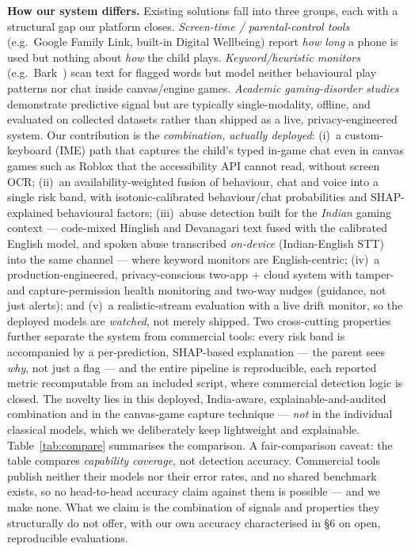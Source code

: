\documentclass[11pt,a4paper]{article}
\begin{document}
\textbf{How our system differs.} Existing solutions fall into three groups, each with a
structural gap our platform closes. \emph{Screen-time / parental-control tools} (e.g.\
Google Family Link, built-in Digital Wellbeing) report \emph{how long} a phone is used
but nothing about \emph{how} the child plays. \emph{Keyword/heuristic monitors} (e.g.\
Bark~\cite{bark2025}) scan text for flagged words but model neither behavioural play
patterns nor chat inside canvas/engine games. \emph{Academic gaming-disorder
studies}~\cite{huang2024,jiang2024,strojny2024} demonstrate predictive signal but are
typically single-modality, offline, and evaluated on collected datasets rather than
shipped as a live, privacy-engineered system. Our contribution is the \emph{combination,
actually deployed}: (i)~a custom-keyboard (IME) path that captures the child's typed
in-game chat even in canvas games such as Roblox that the accessibility API cannot read,
without screen OCR; (ii)~an availability-weighted fusion of behaviour, chat and voice
into a single risk band, with isotonic-calibrated behaviour/chat probabilities and
SHAP-explained behavioural factors; (iii)~abuse detection built
for the \emph{Indian} gaming context --- code-mixed Hinglish and Devanagari text fused
with the calibrated English model, and spoken abuse transcribed \emph{on-device}
(Indian-English STT) into the same channel --- where keyword monitors are
English-centric; (iv)~a production-engineered, privacy-conscious two-app + cloud system
with tamper- and capture-permission health monitoring and two-way nudges (guidance, not
just alerts); and (v)~a realistic-stream evaluation with a live drift monitor,
so the deployed models are \emph{watched}, not merely shipped. Two cross-cutting
properties further separate the system from commercial tools: every risk band is
accompanied by a per-prediction, SHAP-based explanation --- the parent sees \emph{why},
not just a flag --- and the entire pipeline is reproducible, each reported metric
recomputable from an included script, where commercial detection logic is closed. The
novelty lies in this deployed, India-aware, explainable-and-audited combination and in
the canvas-game capture technique --- \emph{not} in the individual classical models,
which we deliberately keep lightweight and explainable. Table~\ref{tab:compare}
summarises the comparison. A fair-comparison caveat: the table compares
\emph{capability coverage}, not detection accuracy. Commercial tools publish neither
their models nor their error rates, and no shared benchmark exists, so no head-to-head
accuracy claim against them is possible --- and we make none. What we claim is the
combination of signals and properties they structurally do not offer, with our own
accuracy characterised in \S6 on open, reproducible evaluations.
\end{document}
